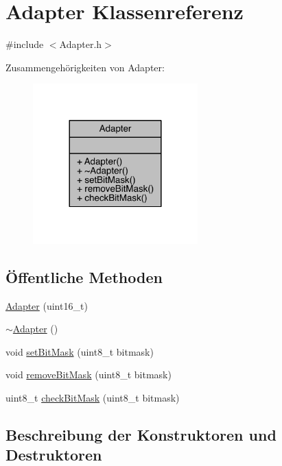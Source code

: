 \hypertarget{class_adapter}{}\section{Adapter Klassenreferenz}
\label{class_adapter}


{\ttfamily \#include $<$Adapter.\+h$>$}



Zusammengehörigkeiten von Adapter\+:
\nopagebreak
\begin{figure}[H]
\begin{center}
\leavevmode
\includegraphics[width=180pt]{class_adapter__coll__graph}
\end{center}
\end{figure}
\subsection*{Öffentliche Methoden}
\begin{DoxyCompactItemize}
\item 
\hyperlink{class_adapter_ae2c6ad0390905b82cac4077642b36620}{Adapter} (uint16\+\_\+t)
\item 
\hyperlink{class_adapter_a08a07acff57eb40aba27455de23ed13c}{$\sim$\+Adapter} ()
\item 
void \hyperlink{class_adapter_adff950a92be7f52dbe08ff3af766a562}{set\+Bit\+Mask} (uint8\+\_\+t bitmask)
\item 
void \hyperlink{class_adapter_a655de45764223d7b1b3847170cc405a5}{remove\+Bit\+Mask} (uint8\+\_\+t bitmask)
\item 
uint8\+\_\+t \hyperlink{class_adapter_a8b1478082798b063a0c04d98fdea06a2}{check\+Bit\+Mask} (uint8\+\_\+t bitmask)
\end{DoxyCompactItemize}


\subsection{Beschreibung der Konstruktoren und Destruktoren}
\hypertarget{class_adapter_ae2c6ad0390905b82cac4077642b36620}{}\label{class_adapter_ae2c6ad0390905b82cac4077642b36620} 
